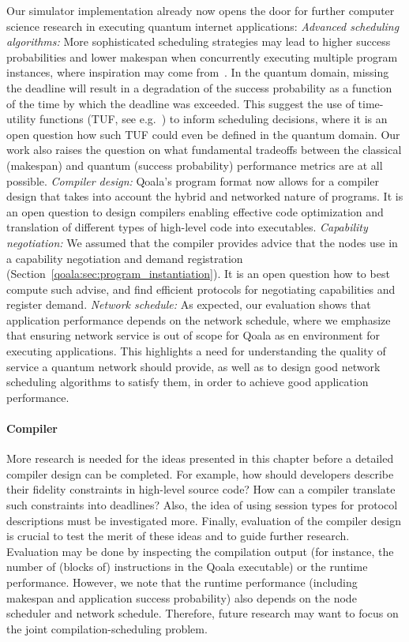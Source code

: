 Our simulator implementation already now opens the door for further computer science research in executing quantum internet applications:
\textit{Advanced scheduling algorithms:}
More sophisticated scheduling strategies may lead to higher success probabilities and lower makespan when concurrently executing multiple program instances, where inspiration may come from~\cite{topcuoglu2002performance, baruah2011scheduling, andersson2006multiprocessor, polychronopoulos1991hierarchical}. 
In the quantum domain, missing the deadline will result in a degradation of the success probability as a function of the time by which the deadline was exceeded.
This suggest the use of time-utility functions (TUF, see e.g.~\cite{jensen1993timeliness, li2004utility}) to inform scheduling decisions, where it is an open question how such TUF could even be defined in the quantum domain.
Our work also raises the question on what fundamental tradeoffs between the classical (makespan) and quantum (success probability) performance metrics are at all possible.
\textit{Compiler design:}
Qoala's program format now allows for a compiler design that takes into account the hybrid and networked nature of programs.
It is an open question to design compilers enabling effective code optimization and translation of different types of high-level code into executables.
\textit{Capability negotiation:}
We assumed that the compiler provides advice that the nodes use in a capability negotiation and demand registration (Section~\ref{qoala:sec:program_instantiation}).
It is an open question how to best compute such advise, and find efficient protocols for negotiating capabilities and register demand.
\textit{Network schedule:}
As expected, our evaluation shows that application performance depends on the network schedule, where we emphasize that ensuring network service is out of scope for Qoala as en environment for executing applications.
This highlights a need for understanding the quality of service a quantum network should provide, as well as to design good network scheduling algorithms to satisfy them, in order to achieve good application performance.



\paragraph{Compiler}
More research is needed for the ideas presented in this chapter before a detailed compiler design can be completed.
For example, how should developers describe their fidelity constraints in high-level source code?
How can a compiler translate such constraints into deadlines?
Also, the idea of using session types for protocol descriptions must be investigated more.
Finally, evaluation of the compiler design is crucial to test the merit of these ideas and to guide further research.
Evaluation may be done by inspecting the compilation output (for instance, the number of (blocks of) instructions in the Qoala executable) or the runtime performance.
However, we note that the runtime performance (including makespan and application success probability) also depends on the node scheduler and network schedule.
Therefore, future research may want to focus on the joint compilation-scheduling problem.


\begin{xstretch}
\printbibliography[heading=subbibintoc,title={References},notcategory=noprint]
\end{xstretch}
